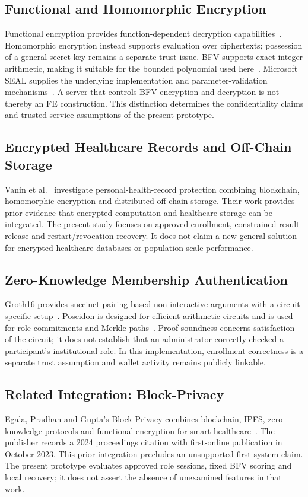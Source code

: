 \documentclass[10pt,twocolumn,a4paper]{article}
\begin{document}
\subsection{Functional and Homomorphic Encryption}
Functional encryption provides function-dependent decryption capabilities~\cite{fe}.
Homomorphic encryption instead supports evaluation over ciphertexts; possession of
a general secret key remains a separate trust issue. BFV supports exact integer
arithmetic, making it suitable for the bounded polynomial used here~\cite{bfv}.
Microsoft SEAL supplies the underlying implementation and parameter-validation
mechanisms~\cite{seal}. A server that controls BFV encryption and decryption is not
thereby an FE construction. This distinction determines the confidentiality claims
and trusted-service assumptions of the present prototype.

\subsection{Encrypted Healthcare Records and Off-Chain Storage}
Vanin et al.~\cite{vanin} investigate personal-health-record protection combining
blockchain, homomorphic encryption and distributed off-chain storage. Their work
provides prior evidence that encrypted computation and healthcare storage can be
integrated. The present study focuses on approved enrollment, constrained result
release and restart/revocation recovery. It does not claim a new general solution
for encrypted healthcare databases or population-scale performance.

\subsection{Zero-Knowledge Membership Authentication}
Groth16 provides succinct pairing-based non-interactive arguments with a
circuit-specific setup~\cite{groth}. Poseidon is designed for efficient arithmetic
circuits and is used for role commitments and Merkle paths~\cite{poseidon}.
Proof soundness concerns satisfaction of the circuit; it does not establish that
an administrator correctly checked a participant's institutional role. In this
implementation, enrollment correctness is a separate trust assumption and wallet
activity remains publicly linkable.

\subsection{Related Integration: Block-Privacy}
Egala, Pradhan and Gupta's Block-Privacy combines blockchain, IPFS, zero-knowledge
protocols and functional encryption for smart healthcare~\cite{egala}. The publisher
records a 2024 proceedings citation with first-online publication in October 2023.
This prior integration precludes an unsupported first-system claim. The present
prototype evaluates approved role sessions, fixed BFV scoring and local recovery;
it does not assert the absence of unexamined features in that work.
\end{document}
